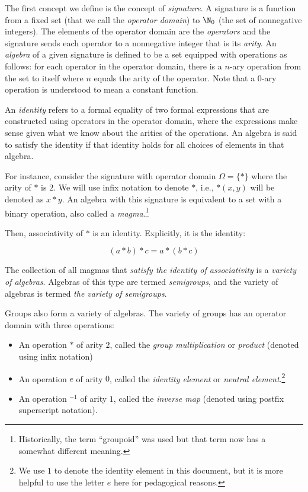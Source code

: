 \documentclass{ucetd}
\begin{document}
The first concept we define is the concept of {\em signature}. A
signature is a function from a fixed set (that we call the {\em
  operator domain}) to $\N_0$ (the set of nonnegative integers). The
elements of the operator domain are the {\em operators} and the
signature sends each operator to a nonnegative integer that is its
{\em arity}. An {\em algebra} of a given signature is defined to be a
set equipped with operations as follows: for each operator in the
operator domain, there is a $n$-ary operation from the set to itself
where $n$ equals the arity of the operator. Note that a $0$-ary
operation is understood to mean a constant function.

An {\em identity} refers to a formal equality of two formal
expressions that are constructed using operators in the operator
domain, where the expressions make sense given what we know about the
arities of the operations. An algebra is said to satisfy the identity
if that identity holds for all choices of elements in that
algebra. 

For instance, consider the signature with operator domain $\Omega = \{
* \}$ where the arity of $*$ is $2$. We will use infix notation to
denote $*$, i.e., $*(x,y)$ will be denoted as $x * y$. An algebra with
this signature is equivalent to a set with a binary operation, also
called a {\em magma}.\footnote{Historically, the term ``groupoid'' was
  used but that term now has a somewhat different meaning.}

Then, associativity of $*$ is an identity. Explicitly, it is the identity:

$$(a * b) * c = a * (b * c)$$

The collection of all magmas that {\em satisfy the identity of
  associativity} is a {\em variety of algebras}. Algebras of this type
are termed {\em semigroups}, and the variety of algebras is termed
{\em the variety of semigroups}.

Groups also form a variety of algebras. The variety of groups has an
operator domain with three operations:

\begin{itemize}
\item An operation $*$ of arity $2$, called the {\em group
  multiplication} or {\em product} (denoted using infix notation)
\item An operation $e$ of arity $0$, called the {\em identity element}
  or {\em neutral element}.\footnote{We use $1$ to denote the identity
    element in this document, but it is more helpful to use the letter
    $e$ here for pedagogical reasons.}
\item An operation ${}^{-1}$ of arity $1$, called the {\em inverse
  map} (denoted using postfix superscript notation).
\end{itemize}
\end{document}
